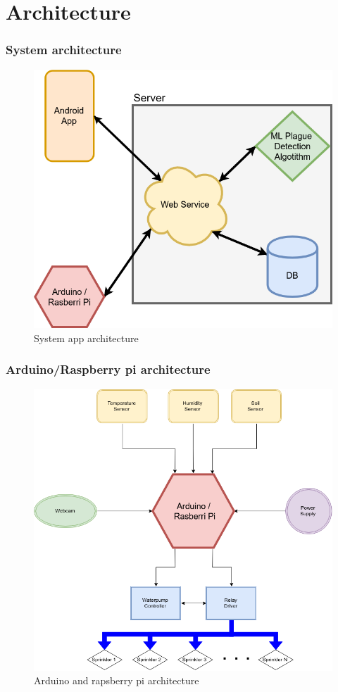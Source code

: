 \documentclass[11pt,a4paper]{article}
\begin{document}
\part*{Architecture}
\section{System architecture}
\begin{figure}[hbtp]
\centering
\includegraphics[scale=0.6]{figures/AppArchitecture.png}
\caption{System app architecture}
\end{figure}

\section{Arduino/Raspberry pi architecture}
\begin{figure}[hbtp]
\centering
\includegraphics[scale=0.6]{figures/ArduinoArch.png}
\caption{Arduino and rapsberry pi architecture}
\end{figure}
\end{document}
